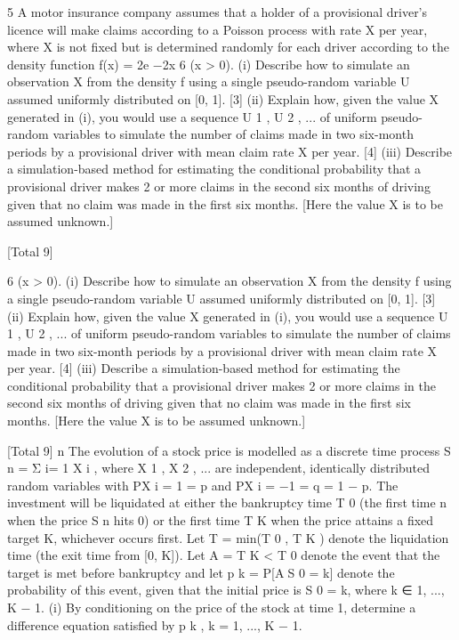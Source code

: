 \documentclass[a4paper,12pt]{article}
\begin{document}
\begin{enumerate}

5
A motor insurance company assumes that a holder of a provisional driver’s
licence will make claims according to a Poisson process with rate X per year,
where X is not fixed but is determined randomly for each driver according to the
density function
f(x) = 2e −2x
6
(x > 0).
(i) Describe how to simulate an observation X from the density f using a
single pseudo-random variable U assumed uniformly distributed on [0, 1].
[3]
(ii) Explain how, given the value X generated in (i), you would use a sequence
U 1 , U 2 , ... of uniform pseudo-random variables to simulate the number of
claims made in two six-month periods by a provisional driver with mean
claim rate X per year.
[4]
(iii) Describe a simulation-based method for estimating the conditional
probability that a provisional driver makes 2 or more claims in the second
six months of driving given that no claim was made in the first six
months. [Here the value X is to be assumed unknown.]

[Total 9]

6
(x > 0).
(i) Describe how to simulate an observation X from the density f using a
single pseudo-random variable U assumed uniformly distributed on [0, 1].
[3]
(ii) Explain how, given the value X generated in (i), you would use a sequence
U 1 , U 2 , ... of uniform pseudo-random variables to simulate the number of
claims made in two six-month periods by a provisional driver with mean
claim rate X per year.
[4]
(iii) Describe a simulation-based method for estimating the conditional
probability that a provisional driver makes 2 or more claims in the second
six months of driving given that no claim was made in the first six
months. [Here the value X is to be assumed unknown.]

[Total 9]
n
The evolution of a stock price is modelled as a discrete time process S n = Σ i=
1 X i ,
where X 1 , X 2 , ... are independent, identically distributed random variables with
P{X i = 1} = p and P{X i = −1} = q = 1 − p. The investment will be liquidated at
either the bankruptcy time T 0 (the first time n when the price S n hits 0) or the
first time T K when the price attains a fixed target K, whichever occurs first.
Let T = min(T 0 , T K ) denote the liquidation time (the exit time from [0, K]). Let
A = {T K < T 0 } denote the event that the target is met before bankruptcy and let
p k = P[AS 0 = k] denote the probability of this event, given that the initial price is
S 0 = k, where k ∈ {1, ..., K − 1}.
(i) By conditioning on the price of the stock at time 1, determine a difference
equation satisfied by p k , k = 1, ..., K − 1.


\end{enumerate}
\end{document}
